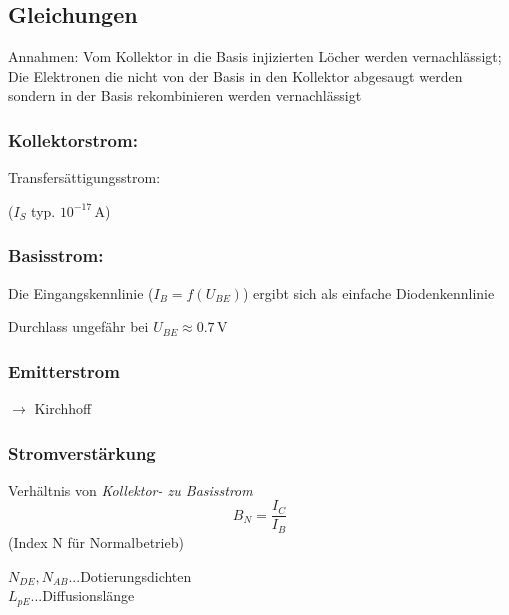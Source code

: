 \documentclass[a4paper, 12pt]{article}
\begin{document}
\subsection*{Gleichungen}
Annahmen: Vom Kollektor in die Basis injizierten Löcher werden vernachlässigt;
Die Elektronen die nicht von der Basis in den Kollektor abgesaugt werden sondern
in der Basis rekombinieren werden vernachlässigt

\subsubsection*{Kollektorstrom:}

Transfersättigungsstrom:

($I_S$ typ. $10^{-17} \, \si{\ampere}$)

\subsubsection*{Basisstrom:}
Die Eingangskennlinie ($I_B=f(U_{BE})$) ergibt sich als einfache Diodenkennlinie


Durchlass ungefähr bei $U_{BE} \approx 0.7 \, \si{\volt}$


\subsubsection*{Emitterstrom}
$\rightarrow$ Kirchhoff

\subsubsection*{Stromverstärkung}
Verhältnis von \emph{Kollektor- zu Basisstrom}
\[ B_N = \frac{I_C}{I_B} \] (Index N für Normalbetrieb)


$N_{DE}, N_{AB}$...Dotierungsdichten\\
$L_{pE}$...Diffusionslänge\\
\end{document}
